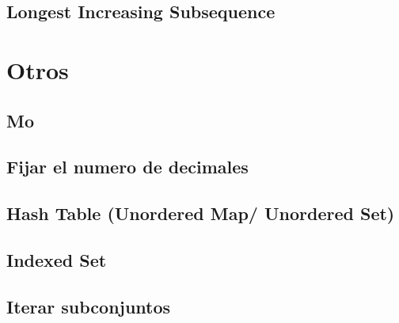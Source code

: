 \documentclass[a4paper,11pt,landscape,twocolumn]{article}
\begin{document}
\subsection{Longest Increasing Subsequence}



\section{Otros}

\subsection{Mo}



\subsection{Fijar el numero de decimales}



\subsection{Hash Table (Unordered Map/ Unordered Set)}



\subsection{Indexed Set}



\subsection{Iterar subconjuntos}
\end{document}
